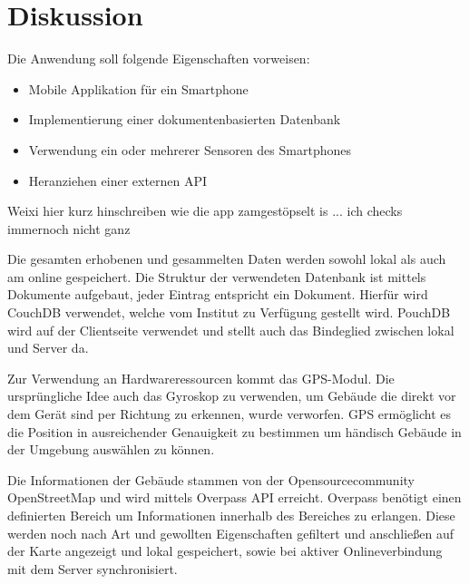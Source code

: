 \chapter{Diskussion}
\label{sec:diskussion}
Die Anwendung soll folgende Eigenschaften vorweisen:
\begin{itemize}
\item Mobile Applikation für ein Smartphone
\item Implementierung einer dokumentenbasierten Datenbank
\item Verwendung ein oder mehrerer Sensoren des Smartphones
\item Heranziehen einer externen API
\end{itemize}

Weixi hier kurz hinschreiben wie die app zamgestöpselt is ... ich checks immernoch nicht ganz

Die gesamten erhobenen und gesammelten Daten werden sowohl lokal als auch am online gespeichert. Die Struktur der verwendeten Datenbank ist mittels Dokumente aufgebaut, jeder Eintrag entspricht ein Dokument. Hierfür wird CouchDB verwendet, welche vom Institut zu Verfügung gestellt wird. PouchDB wird auf der Clientseite verwendet und stellt auch das Bindeglied zwischen lokal und Server da.

Zur Verwendung an Hardwareressourcen kommt das GPS-Modul. Die ursprüngliche Idee auch das Gyroskop zu verwenden, um Gebäude die direkt vor dem Gerät sind per Richtung zu erkennen, wurde verworfen. GPS ermöglicht es die Position in ausreichender Genauigkeit zu bestimmen um händisch Gebäude in der Umgebung auswählen zu können.

Die Informationen der Gebäude stammen von der Opensourcecommunity OpenStreetMap und wird mittels Overpass API erreicht. Overpass benötigt einen definierten Bereich um Informationen innerhalb des Bereiches zu erlangen. Diese werden noch nach Art und gewollten Eigenschaften gefiltert und anschließen auf der Karte angezeigt und lokal gespeichert, sowie bei aktiver Onlineverbindung mit dem Server synchronisiert.
 
